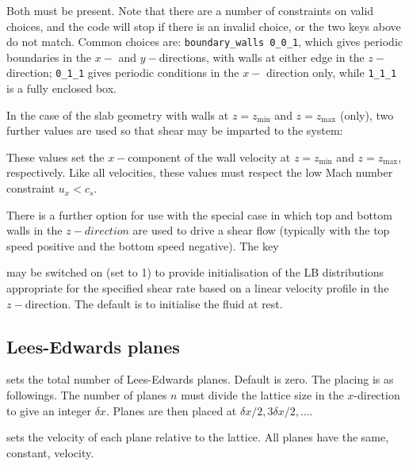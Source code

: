 
Both must be present. Note that there are a number of constraints on
valid choices, and the code will stop if there is an invalid choice, or
the two keys above do not match. Common choices are:
\texttt{boundary\_walls 0\_0\_1},
which gives periodic boundaries in the $x-$ and $y-$directions, with
walls at either edge in the $z-$direction; \texttt{0\_1\_1}
gives periodic conditions in the $x-$ direction only, while
\texttt{1\_1\_1} is a fully enclosed box.

In the case of the slab geometry with walls at $z = z_{\min}$ and
$z= z_{\max}$ (only),
two further values are used so that shear may be imparted to the system:



These values set the $x-$component of the wall velocity at
$z = z_{\min}$ and $z = z_{\max}$, respectively. Like all
velocities, these values must respect the low Mach number
constraint $u_x < c_s$.

There is a further option for use with the special case in which
top and bottom walls in the $z-direction$ are used to drive a shear
flow (typically with the top speed positive and the bottom speed
negative). The key


may be switched on (set to 1) to provide initialisation of the
LB distributions appropriate for the specified shear rate based
on a linear velocity profile in the $z-$direction. The default
is to initialise the fluid at rest.

\subsection{Lees-Edwards planes}


sets the total number of Lees-Edwards planes. Default is zero.
The placing is as followings. The number of planes $n$ must
divide the lattice size in the $x$-direction to give an integer
$\delta x$. Planes are then placed at $\delta x / 2, 3\delta x/2, \ldots$.


sets the velocity of each plane relative to the lattice. All planes
have the same, constant, velocity.


